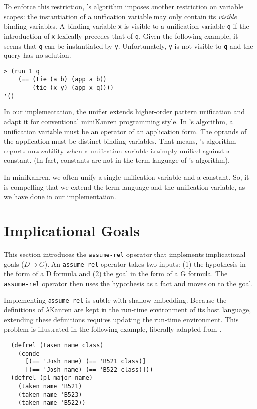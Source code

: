 \documentclass[acmlarge,review]{acmart}
\theoremstyle{definition}
\begin{document}
To enforce this restriction, \citet{miller_logic_1991}'s algorithm
imposes another restriction on variable scopes: the instantiation of a
unification variable may only contain its \emph{visible} binding variables.
A binding variable \texttt{x} is visible to a unification variable \texttt{q} if
the introduction of \texttt{x} lexically precedes that of \texttt{q}.
Given the following example, it seems that \texttt{q} can be instantiated by
\texttt{y}. Unfortunately, \texttt{y} is not visible to \texttt{q} and the
query has no solution.
\begin{lstlisting}
> (run 1 q
    (== (tie (a b) (app a b))
        (tie (x y) (app x q))))
'()
\end{lstlisting}

In our implementation, the unifier extends higher-order pattern unification
and adapt it for conventional miniKanren programming style.
In \citet{miller_logic_1991}'s algorithm, a unification variable must be an
operator of an application form. The oprands of the application must be distinct
binding variables. That means, \citet{miller_logic_1991}'s algorithm reports
unsovability when a unification variable is simply unified against a constant.
(In fact, constants are not in the term language of
\citet{miller_logic_1991}'s algorithm).

In miniKanren, we often unify a single unification variable and a constant.
So, it is compelling that we extend the term language and the unification variable,
as we have done in our implementation.

\section{Implicational Goals}
This section introduces the \texttt{assume-rel} operator that implements
implicational goals ($D \supset G$).
An \texttt{assume-rel} operator takes two inputs: (1) the hypothesis in
the form of a D formula and (2) the goal in the form of a G formula.
The \texttt{assume-rel} operator then uses the hypothesis as a fact and
moves on to the goal.

Implementing \texttt{assume-rel} is subtle with shallow embedding.
Because the definitions of $\lambda$Kanren are kept in the run-time environment
of its host language, extending these definitions requires updating
the run-time environment. This problem is illustrated in the following
example, liberally adapted from \citet[p.~80]{miller_programming_2012}.

\begin{lstlisting}
  (defrel (taken name class)
    (conde
      [(== 'Josh name) (== 'B521 class)]
      [(== 'Josh name) (== 'B522 class)]))
  (defrel (pl-major name)
    (taken name 'B521)
    (taken name 'B523)
    (taken name 'B522))
\end{lstlisting}
\end{document}
